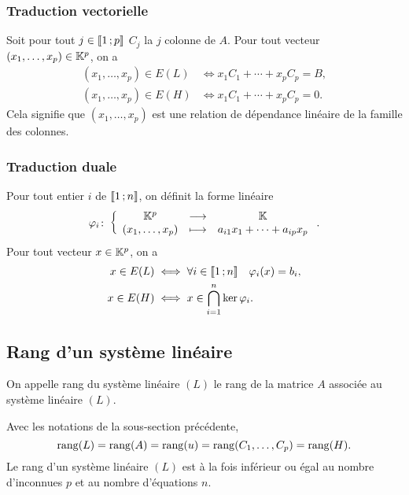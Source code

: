\subsubsection{Traduction vectorielle}

Soit pour tout $j \in \mathopen{\llbracket}1\mathclose{}\mathpunct{};p\mathclose{\rrbracket}$ $C_j$ la $j$\ieme{} colonne de $A$. Pour tout vecteur $(x_1,\ldots,x_p) \in \mathbb{K}^p$, on a
\begin{align}
  (x_1,\ldots,x_p) \in E(L) &\iff x_1C_1+\dotsb+x_pC_p=B, \\
  (x_1,\ldots,x_p) \in E(H) &\iff x_1C_1+\dotsb+x_pC_p=0.
\end{align}
Cela signifie que $(x_1,\ldots,x_p)$ est une relation de dépendance linéaire de la famille des colonnes.

\subsubsection{Traduction duale}

Pour tout entier $i$ de $\mathopen{\llbracket}1\mathclose{}\mathpunct{};n\mathclose{\rrbracket}$, on définit la forme linéaire 
\begin{equation}
\varphi_i\colon \left\{\begin{array}{ccc} \mathbb{K}^p & \longrightarrow &\mathbb{K}\\ (x_1,\ldots,x_p) & \longmapsto & a_{i1}x_1+ \dotsb +a_{ip}x_p \end{array} \right..
\end{equation} 
 Pour tout vecteur $x \in \mathbb{K}^p$, on a
\begin{align}
  x \in E(L) &\iff \forall i \in \mathopen{\llbracket}1\mathclose{}\mathpunct{};n\mathclose{\rrbracket} \quad \varphi_i(x)=b_i, \\
  x \in E(H) &\iff x\in\bigcap_{i=1}^n\ker \varphi_i.
\end{align}

\subsection{Rang d'un système linéaire}

\begin{defdef}
  On appelle rang du système linéaire $(L)$ le rang de la matrice $A$ associée au système linéaire $(L)$.
\end{defdef}
%
\begin{prop}
  Avec les notations de la sous-section précédente,
  \begin{equation}
    \operatorname{rang}(L)=\operatorname{rang}(A)=\operatorname{rang}(u)=\operatorname{rang}(C_1,\ldots,C_p)=\operatorname{rang}(H).
  \end{equation}
  Le rang d'un système linéaire $(L)$ est à la fois inférieur ou égal au nombre d'inconnues $p$ et au nombre d'équations $n$.
\end{prop}

